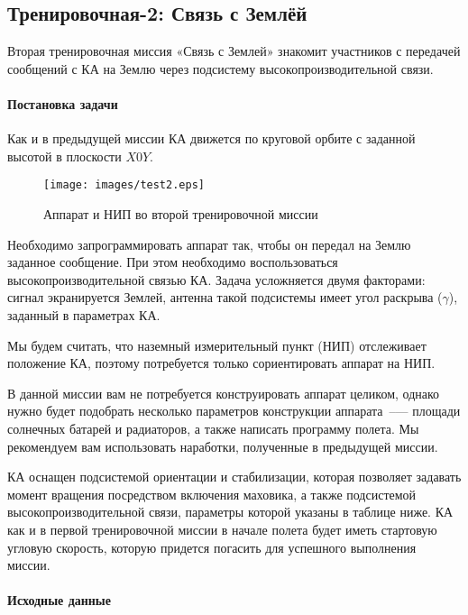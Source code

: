 \documentclass[12pt,a4paper]{article}
\begin{document}
\clearpage
\subsection{Тренировочная-2: Связь с Землёй}
\label{Sec:Test2}

Вторая тренировочная миссия «Связь с Землей» знакомит участников с передачей
сообщений с КА на Землю через подсистему высокопроизводительной связи.

\paragraph{Постановка задачи} 

Как и в предыдущей миссии КА движется по круговой орбите с заданной высотой в плоскости
$X0Y$.

\begin{figure}[tbh]
  \begin{center}
    \texttt{[image: images/test2.eps]}
    \caption{Аппарат и НИП во второй тренировочной миссии}
    \label{Pic:test2}
  \end{center}
\end{figure}

Необходимо запрограммировать аппарат так, чтобы он передал на Землю заданное
сообщение. При этом необходимо воспользоваться   высокопроизводительной связью КА. Задача
усложняется двумя факторами: сигнал экранируется Землей, антенна такой подсистемы имеет
угол раскрыва ($\gamma$), заданный в параметрах КА.

Мы будем считать, что наземный измерительный пункт (НИП) отслеживает положение КА, поэтому
потребуется только сориентировать аппарат на НИП.

В данной миссии вам не потребуется конструировать аппарат целиком, однако нужно будет
подобрать несколько параметров конструкции аппарата~--— площади солнечных батарей и
радиаторов, а также написать программу полета. Мы рекомендуем вам использовать наработки,
полученные в предыдущей миссии.

КА оснащен подсистемой ориентации и стабилизации, которая позволяет задавать момент
вращения посредством включения маховика, а также подсистемой высокопроизводительной связи,
параметры которой указаны в таблице ниже. КА как и в первой тренировочной миссии в начале
полета будет иметь стартовую угловую скорость, которую придется погасить для успешного
выполнения миссии.

\paragraph{Исходные данные}
\end{document}
